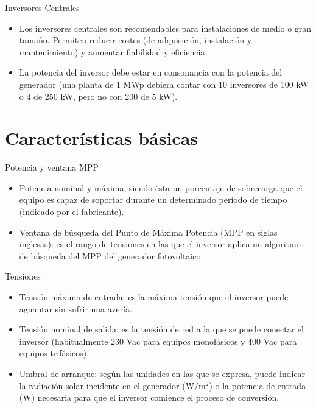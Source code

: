 \documentclass[aspectratio=169, usenames,svgnames,dvipsnames]{beamer}
\begin{document}
\begin{frame}[label={sec:org6800c58}]{Inversores Centrales}
\begin{itemize}
\item Los \alert{inversores centrales} son recomendables para instalaciones de
medio o gran tamaño. Permiten reducir costes (de adquisición,
instalación y mantenimiento) y aumentar fiabilidad y eficiencia.

\item \alert{La potencia del inversor debe estar en consonancia con la potencia
del generador} (una planta de 1 MWp debiera contar con 10 inversores
de 100 kW o 4 de 250 kW, pero no con 200 de 5 kW).
\end{itemize}
\end{frame}

\section{Características básicas}
\label{sec:org06469e5}
\begin{frame}[label={sec:orgbbd667c}]{Potencia y ventana MPP}
\begin{itemize}
\item \alert{Potencia nominal y máxima}, siendo ésta un porcentaje de sobrecarga
que el equipo es capaz de soportar durante un determinado período de
tiempo (indicado por el fabricante).

\item \alert{Ventana de búsqueda del Punto de Máxima Potencia} (MPP en siglas
inglesas): es el rango de tensiones en las que el inversor aplica un
algoritmo de búsqueda del MPP del generador fotovoltaico.
\end{itemize}
\end{frame}

\begin{frame}[label={sec:org337eebe}]{Tensiones}
\begin{itemize}
\item \alert{Tensión máxima de entrada}: es la máxima tensión que el inversor
puede aguantar sin sufrir una avería.

\item \alert{Tensión nominal de salida}: es la tensión de red a la que se puede
conectar el inversor (habitualmente 230 Vac para equipos monofásicos
y 400 Vac para equipos trifásicos).

\item \alert{Umbral de arranque}: según las unidades en las que se expresa, puede
indicar la radiación solar incidente en el generador
(\(\si{\watt\per\meter\squared}\)) o la potencia de entrada (W)
necesaria para que el inversor comience el proceso de conversión.
\end{itemize}
\end{frame}
\end{document}
